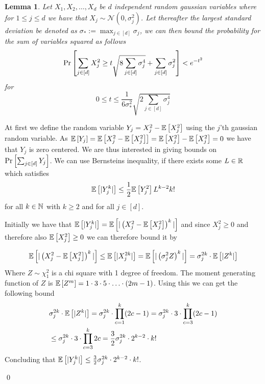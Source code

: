 \documentclass[a4paper,12pt]{article}
\renewenvironment{proof}{{\textit{Proof} \\}}{\qed}
\newtheorem{lemma}{Lemma}[section]
\begin{document}
\begin{lemma}
\label{lem:Bernstein}
Let $X_1, X_2, \dots , X_d$ be $d$ independent random gaussian variables 
where for $ 1 \le j \le d$ we have that $X_j \sim \mathcal{N}(0, \sigma_j^2)$.
Let thereafter the largest standard deviation be denoted as $\sigma_* := \max_{j \in [d]} \sigma_j$,
we can then bound the probability for the sum of variables squared as follows 
\[
\Pr\left [\sum_{j \in [d]} X_j^2  \ge 
    t \sqrt{8 \sum_{j \in [d]} \sigma_j^4} +
    \sum_{j \in [d]} \sigma_j^2  \right] < e^{-t^2}
\]
for
\[
0 \le t \le 
    \frac{1}{6 \sigma_*^2} \sqrt{2 \sum_{j \in [d]} \sigma_j^4}
\]
\end{lemma}
\begin{proof}
At first we define the random variable $Y_j = X_j^2 - \mathbb{E} \left [ X_j^2  \right]$ 
using the $j$'th gaussian random variable.
As $\mathbb{E} \left [ Y_j  \right] = \mathbb{E} \left [ X_j^2 - \mathbb{E} \left [ X_j^2  \right]  \right] = \mathbb{E} \left [ X_j^2  \right] - \mathbb{E} \left [ X_j^2  \right] = 0$ 
we have that $Y_j$ is zero centered. We are thus interested in giving bounds on
$\Pr\left [\sum_{j \in [d]} Y_j \right]$. 
We can use Bernsteins inequality, if there exists some $L \in \mathbb{R}$ which satisfies 
\begin{equation}
\label{eq:BernCon}
    \mathbb{E} \left [  |Y^k_j|   \right] \le \frac{1}{2} \mathbb{E} \left [ Y_j^2  \right] L^{k-2} k!
\end{equation}
for all $k \in \mathbb{N}$ with $k \ge 2$ and for all $j \in [d]$.

Initially we have that $\mathbb{E} \left [  |Y_j^k|   \right] = \mathbb{E} \left [  |\left (X_j^2 - \mathbb{E} \left [ X_j^2  \right]\right)^k|  \right]$
and since $X_j^2 \ge 0$ and therefore also $\mathbb{E} \left [ X_j^2  \right] \ge 0$ 
we can therefore bound it by

\[
    \mathbb{E} \left [  |\left (X_j^2 - \mathbb{E} \left [ X_j^2  \right]\right)^k|  \right] \le \mathbb{E} \left [  | X_j^{2k} |   \right] =
    \mathbb{E} \left [  | \left (\sigma_j^2 Z\right)^{k} |   \right] = 
    \sigma_j^{2k} \cdot \mathbb{E} \left [  |Z^{k} |   \right]
\]
Where $Z \sim \chi^2_1$ is a chi square with 1 degree of freedom.
The moment generating function of $Z$ is 
$\mathbb{E} \left [ Z^m  \right] = 1 \cdot 3 \cdot 5 \cdot \ldots \cdot (2m - 1) $.
Using this we can get the following bound
\begin{align*}
    &\sigma_j^{2k} \cdot \mathbb{E} \left [  |Z^{k} |   \right] =
    \sigma_j^{2k} \cdot \prod_{c=1}^k(2c-1) =
    \sigma_j^{2k} \cdot 3\cdot \prod_{c=3}^k (2c-1) \\
    &\le \sigma_j^{2k} \cdot 3 \cdot \prod_{c=3}^k 2c
    = \frac{3}{2}\sigma_j^{2k} \cdot 2^{k-2} \cdot k!
\end{align*}
Concluding that $\mathbb{E} \left [  |Y_j^k|   \right] \le \frac{3}{2}\sigma_j^{2k} \cdot 2^{k-2} \cdot k!$.


\end{proof}
\end{document}
